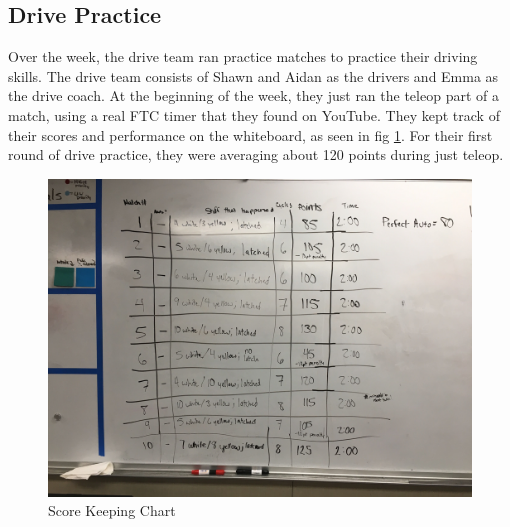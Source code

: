 \documentclass{article}
\begin{document}
\subsection{Drive Practice}
Over the week, the drive team ran practice matches to practice their driving skills. The drive team consists of Shawn and Aidan as the drivers and Emma as the drive coach. At the beginning of the week, they just ran the teleop part of a match, using a real FTC timer that they found on YouTube. They kept track of their scores and performance on the whiteboard, as seen in fig \ref{fig:chart}. For their first round of drive practice, they were averaging about 120 points during just teleop. 

\begin{figure}
    \centering
    \includegraphics[width=.6 \textwidth]{23_02-04/images/IMG_1512.JPG}
    \caption{Score Keeping Chart}
    \label{fig:chart}
\end{figure}
\end{document}
